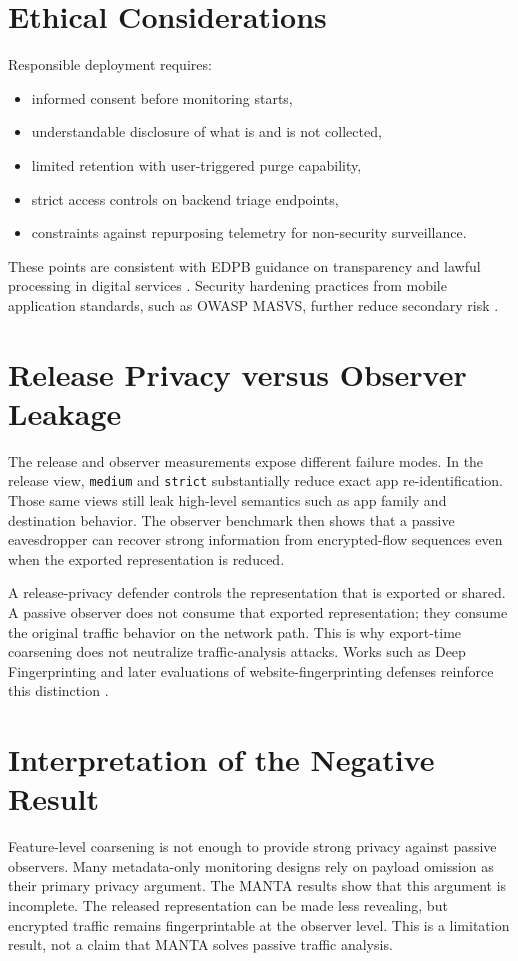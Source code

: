 \section{Ethical Considerations}
Responsible deployment requires:
\begin{itemize}[leftmargin=*]
  \item informed consent before monitoring starts,
  \item understandable disclosure of what is and is not collected,
  \item limited retention with user-triggered purge capability,
  \item strict access controls on backend triage endpoints,
  \item constraints against repurposing telemetry for non-security surveillance.
\end{itemize}
These points are consistent with EDPB guidance on transparency and lawful processing in digital
services \citep{edpb_guidelines_2020}. Security hardening practices from mobile application
standards, such as OWASP MASVS, further reduce secondary risk \citep{owasp_masvs}.

\section{Release Privacy versus Observer Leakage}
The release and observer measurements expose different failure modes. In the release view,
\texttt{medium} and \texttt{strict} substantially reduce exact app re-identification. Those same views
still leak high-level semantics such as app family and destination behavior. The observer benchmark
then shows that a passive eavesdropper can recover strong information from encrypted-flow sequences
even when the exported representation is reduced.

A release-privacy defender controls the representation that is exported or shared. A passive
observer does not consume that exported representation; they consume the original traffic behavior
on the network path. This is why export-time coarsening does not neutralize traffic-analysis
attacks. Works such as Deep Fingerprinting and later evaluations of website-fingerprinting defenses
reinforce this distinction \citep{deep_fingerprinting_2018,wf_sok_2022}.

\section{Interpretation of the Negative Result}
Feature-level coarsening is not enough to provide strong privacy against passive observers. Many
metadata-only monitoring designs rely on payload omission as their primary privacy argument. The
MANTA results show that this argument is incomplete. The released representation can be made less
revealing, but encrypted traffic remains fingerprintable at the observer level. This is a limitation
result, not a claim that MANTA solves passive traffic analysis.

